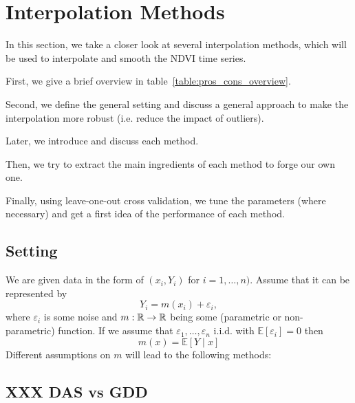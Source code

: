 \newcommand{\RobItPlot}{fitted to different (SCL45) NDVI time series. Iterations of a robustifing refit (as indicated in section~\ref{sec:loess_robustify}) are also displayed}


\chapter{Interpolation Methods}
\label{sec:itpl}

In this section, we take a closer look at several interpolation methods, which will be used to interpolate and smooth the NDVI time series.

First, we give a brief overview in table~\ref{table:pros_cons_overview}.

Second, we define the general setting and discuss a general approach to make the interpolation more robust (i.e. reduce the impact of outliers).

Later, we introduce and discuss each method.

Then, we try to extract the main ingredients of each method to forge our own one.

Finally, using leave-one-out cross validation, we tune the parameters (where necessary) and get a first idea of the performance of each method.


\footnotesize

\normalsize


\section{Setting}
We are given data in the form of $\left(x_{i}, Y_{i}\right)$ for $i=1, \ldots, n)$. Assume that it can be represented by
$$
	Y_{i}=m\left(x_{i}\right)+\varepsilon_{i},
$$
where $\varepsilon_i$ is some noise and $m: \mathbb{R} \rightarrow \mathbb{R}$ being some (parametric or non-parametric) function. If we assume that $\varepsilon_{1}, \ldots, \varepsilon_{n}$ i.i.d. with $\mathbb{E}\left[\varepsilon_{i}\right]=0$ then $$m(x)=\mathbb{E}[Y \mid x]$$
Different assumptions on $m$ will lead to the following methods:

\section{XXX DAS vs GDD}

